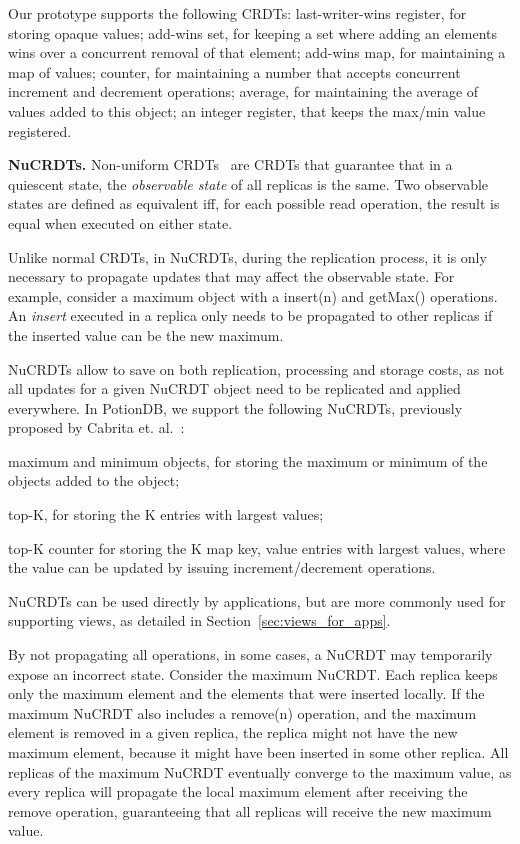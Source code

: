 \documentclass[sigplan,twocolumn,review,anonymous]{acmart}
\newcommand{\code}[1]{\textsf{\small{#1}}}
\newcommand{\nuno}[1]{\nbnote{Nuno}{red}{#1}}
\begin{document}
Our prototype supports the following CRDTs: last-writer-wins register, for storing opaque values;
add-wins set, for keeping a set where adding an elements wins over a concurrent removal of that element;
add-wins map, for maintaining a map of values;
counter, for maintaining a number that accepts concurrent increment and decrement operations;
average, for maintaining the average of values added to this object;
an integer register, that keeps the max/min value registered. %

\noindent
\textbf{NuCRDTs.} Non-uniform CRDTs~\cite{Cabrita17Nonuniform} are CRDTs that guarantee that in a quiescent state, 
the \emph{observable state} of all replicas is the same. 
Two observable states are defined as equivalent iff, for each possible read operation, the result is equal when executed on either state.

Unlike normal CRDTs, in NuCRDTs, during the replication process, it is only necessary to propagate
updates that may affect the observable state. For example, consider a maximum object with a \code{insert(n)} and 
\code{getMax()} operations. An \emph{insert} executed in a replica only needs to be propagated 
to other replicas if the inserted value can be the new maximum. 

NuCRDTs allow to save on both replication, processing and storage costs, as not all updates for a given NuCRDT object need 
to be replicated and applied everywhere.
In PotionDB, we support the following NuCRDTs, previously proposed by Cabrita et. al.~\cite{Cabrita17Nonuniform}: 
\begin{inparaenum}[(i)]
\item maximum and minimum objects, for storing the maximum or minimum of the objects added to the object;
\item top-K,  for storing the K entries with largest values;
\item top-K counter  for storing the K map key, value entries with largest values, where the value
can be updated by issuing increment/decrement operations.
\end{inparaenum}
NuCRDTs can be used directly by applications, but are more commonly used for supporting 
views, as detailed in Section~\ref{sec:views_for_apps}.

\nuno{Dar mais detalhes de como funcionam?}

By not propagating all operations, in some cases, a NuCRDT may temporarily expose an incorrect state.
Consider the maximum NuCRDT.  Each replica keeps only the maximum element and 
the elements that were inserted locally. If the maximum NuCRDT also includes a \code{remove(n)} operation,
and the maximum element is removed in a given replica, the replica might not have the new maximum element,
because it might have been inserted in some other replica.  All replicas of the maximum NuCRDT eventually 
converge to the maximum value, as every replica will propagate the local maximum element after receiving the 
remove operation, guaranteeing that all replicas will receive the new maximum value.
\end{document}
